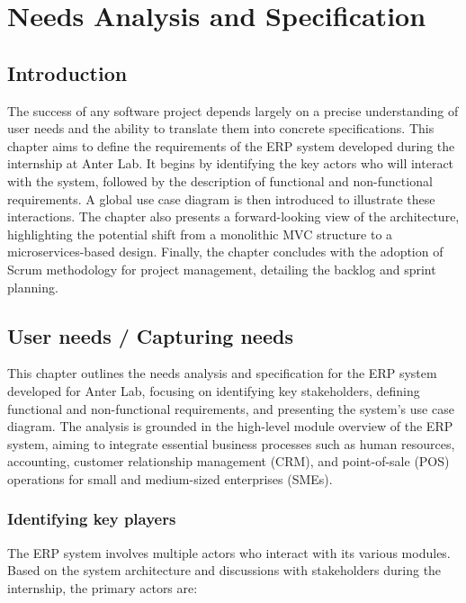 \chapter{Needs Analysis and Specification}
\minitoc %

\section*{Introduction}
The success of any software project depends largely on a precise understanding of user needs and the ability to translate them into concrete specifications. 
This chapter aims to define the requirements of the ERP system developed during the internship at Anter Lab. 
It begins by identifying the key actors who will interact with the system, followed by the description of functional and non-functional requirements. 
A global use case diagram is then introduced to illustrate these interactions. 
The chapter also presents a forward-looking view of the architecture, highlighting the potential shift from a monolithic MVC structure to a microservices-based design. 
Finally, the chapter concludes with the adoption of Scrum methodology for project management, detailing the backlog and sprint planning.

\section{User needs / Capturing needs}
This chapter outlines the needs analysis and specification for the ERP system developed for Anter Lab, focusing on identifying key stakeholders, defining functional and non-functional requirements, and presenting the system's use case diagram. The analysis is grounded in the high-level module overview of the ERP system, aiming to integrate essential business processes such as human resources, accounting, customer relationship management (CRM), and point-of-sale (POS) operations for small and medium-sized enterprises (SMEs).

\subsection{Identifying key players}
The ERP system involves multiple actors who interact with its various modules. Based on the system architecture and discussions with stakeholders during the internship, the primary actors are:

